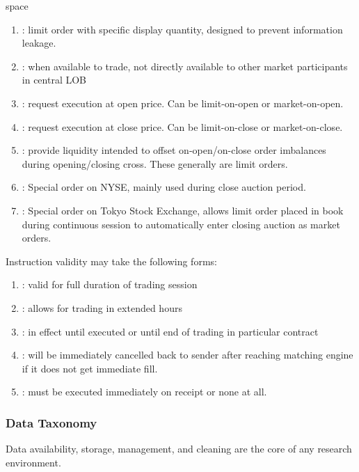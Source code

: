 \begin{definition} {\color{white}space}
\begin{enumerate}[label=\roman*.]
\item {}: limit order with specific display quantity, designed to prevent information leakage.
\item {}: when available to trade, not directly available to other market participants in central LOB
\item {}: request execution at open price. Can be limit-on-open or market-on-open.
\item {}: request execution at close price. Can be limit-on-close or market-on-close.
\item {}: provide liquidity intended to offset on-open/on-close order imbalances during opening/closing cross. These generally are limit orders.
\item {}: Special order on NYSE, mainly used during close auction period.
\item {}: Special order on Tokyo Stock Exchange, allows limit order placed in book during continuous session to automatically enter closing auction as market orders.
\end{enumerate}
\end{definition}

Instruction validity may take the following forms:
\begin{enumerate}[label=\roman*.]
\setlength{\itemsep}{0pt}
\item {}: valid for full duration of trading session
\item {}: allows for trading in extended hours
\item {}: in effect until executed or until end of trading in particular contract
\item {}: will be immediately cancelled back to sender after reaching matching engine if it does not get immediate fill.
\item {}: must be executed immediately on receipt or none at all.
\end{enumerate}

\subsubsection{Data Taxonomy}

Data availability, storage, management, and cleaning are the core of any research environment.\\

